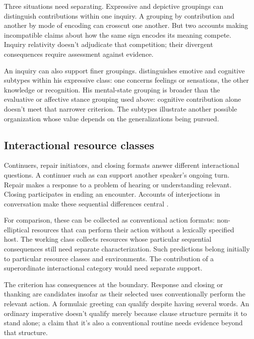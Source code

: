 \documentclass[12pt]{article}
\begin{document}
Three situations need separating. Expressive and depictive groupings can
distinguish contributions within one inquiry. A grouping by contribution
and another by mode of encoding can crosscut one another. But two accounts
making incompatible claims about how the same sign encodes its meaning
compete. Inquiry relativity doesn't adjudicate that competition; their divergent consequences require assessment against evidence.

An inquiry can also support finer groupings. \textcite[113]{ameka1992}
distinguishes emotive and cognitive subtypes within his expressive class:
one concerns feelings or sensations, the other knowledge or recognition.
His mental-state grouping is broader than the evaluative or affective
stance grouping used above: cognitive contribution alone doesn't meet
that narrower criterion. The subtypes illustrate another possible
organization whose value depends on the generalizations being pursued.

\subsection{Interactional resource classes}

Continuers, repair initiators, and closing formats answer different
interactional questions. A continuer such as  can support
another speaker's ongoing turn. Repair  makes a response to
a problem of hearing or understanding relevant. Closing 
participates in ending an encounter. Accounts of interjections in
conversation make these sequential differences central
\citep[257--259, 263--265]{dingemanse2024}.

For comparison, these can be collected as conventional action formats:
non-elliptical resources that can perform their action without a lexically
specified host. The working class collects resources whose particular sequential
consequences still need separate characterization. Such predictions belong initially to
particular resource classes and environments. The contribution of a
superordinate interactional category would need separate support.

The criterion has consequences at the boundary. Response 
and closing or thanking  are candidates insofar as their
selected uses conventionally perform the relevant action. A formulaic
greeting  can qualify despite having several words.
An ordinary imperative  doesn't qualify merely because
clause structure permits it to stand alone; a claim that it's also a
conventional routine needs evidence beyond that structure.
\end{document}
